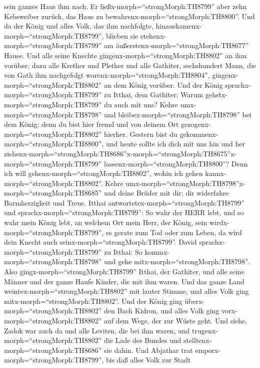 sein ganzes Haus ihm nach. Er ließx-morph=``strongMorph:TH8799'' aber
zehn Kebsweiber zurück, das Haus zu
bewahrenx-morph=``strongMorph:TH8800''.  Und da der König
und alles Volk, das ihm nachfolgte,
hinauskamenx-morph=``strongMorph:TH8799'', blieben sie
stehenx-morph=``strongMorph:TH8799'' am
äußerstenx-morph=``strongMorph:TH8677'' Hause.  Und alle
seine Knechte gingenx-morph=``strongMorph:TH8802'' an ihm vorüber; dazu
alle Krether und Plether und alle Gathiter, sechshundert Mann, die von
Gath ihm nachgefolgt warenx-morph=``strongMorph:TH8804'',
gingenx-morph=``strongMorph:TH8802'' an dem König vorüber. 
Und der König sprachx-morph=``strongMorph:TH8799'' zu Itthai, dem
Gathiter: Warum gehstx-morph=``strongMorph:TH8799'' du auch mit uns?
Kehre umx-morph=``strongMorph:TH8798'' und
bleibex-morph=``strongMorph:TH8798'' bei dem König; denn du bist hier
fremd und von deinem Ort gezogenx-morph=``strongMorph:TH8802'' hierher.
 Gestern bist du gekommenx-morph=``strongMorph:TH8800'',
und heute sollte ich dich mit uns hin und her
ziehenx-morph=``strongMorph:TH8686''\textbar x-morph=``strongMorph:TH8675''x-morph=``strongMorph:TH8799''
lassenx-morph=``strongMorph:TH8800''? Denn ich will
gehenx-morph=``strongMorph:TH8802'', wohin ich gehen
kannx-morph=``strongMorph:TH8802''. Kehre
umx-morph=``strongMorph:TH8798''x-morph=``strongMorph:TH8685'' und deine
Brüder mit dir; dir widerfahre Barmherzigkeit und Treue. 
Itthai antwortetex-morph=``strongMorph:TH8799'' und
sprachx-morph=``strongMorph:TH8799'': So wahr der HERR lebt, und so wahr
mein König lebt, an welchem Ort mein Herr, der König, sein
wirdx-morph=``strongMorph:TH8799'', es gerate zum Tod oder zum Leben, da
wird dein Knecht auch seinx-morph=``strongMorph:TH8799''. 
David sprachx-morph=``strongMorph:TH8799'' zu Itthai: So
kommx-morph=``strongMorph:TH8798'' und gehe
mitx-morph=``strongMorph:TH8798''. Also
gingx-morph=``strongMorph:TH8799'' Itthai, der Gathiter, und alle seine
Männer und der ganze Haufe Kinder, die mit ihm waren.  Und
das ganze Land weintex-morph=``strongMorph:TH8802'' mit lauter Stimme,
und alles Volk ging mitx-morph=``strongMorph:TH8802''. Und der König
ging überx-morph=``strongMorph:TH8802'' den Bach Kidron, und alles Volk
ging vorx-morph=``strongMorph:TH8802'' auf dem Wege, der zur Wüste geht.
 Und siehe, Zadok war auch da und alle Leviten, die bei ihm
waren, und trugenx-morph=``strongMorph:TH8802'' die Lade des Bundes und
stelltenx-morph=``strongMorph:TH8686'' sie dahin. Und Abjathar trat
emporx-morph=``strongMorph:TH8799'', bis daß alles Volk zur Stadt
